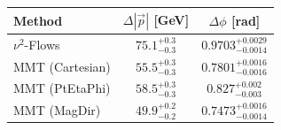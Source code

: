     \begin{tabular}{lcc}
        \toprule
        Method & $\Delta |\vec p|$ [GeV] & $\Delta \phi$ [rad] \\
        \midrule
        $\nu^2$-Flows & $75.1^{+0.3}_{-0.3}$ & $0.9703^{+0.0029}_{-0.0014}$ \\
        MMT (Cartesian) & $55.5^{+0.3}_{-0.3}$ & $0.7801^{+0.0016}_{-0.0016}$ \\
        MMT (PtEtaPhi) & $58.5^{+0.3}_{-0.3}$ & $0.827^{+0.002}_{-0.003}$ \\
        MMT (MagDir) & $49.9^{+0.2}_{-0.2}$ & $0.7473^{+0.0016}_{-0.0014}$ \\
        \bottomrule
    \end{tabular}
